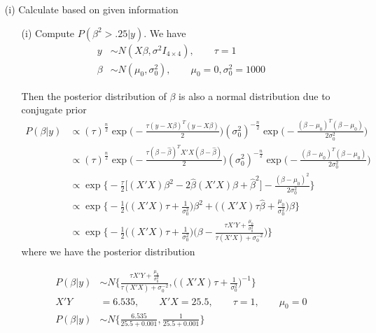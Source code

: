 \begin{itemize}

\item[(i)] Calculate based on given information 

\begin{itemize}
\item[(i)] Compute $P(\beta^2 > .25| y)$.
We have
\begin{align*}
y & \sim N(X \beta, \sigma^2 I_{4 \times 4}), \qquad \tau = 1 \\
\beta & \sim N(\mu_0, \sigma_0^2), \qquad \mu_0 = 0,  \sigma_0^2= 1000
\end{align*}	

Then the posterior distribution of $\beta$ is also a normal distribution due to conjugate prior
\begin{align*}
P(\beta | y) & \propto (\tau)^{\frac{n}{2}} \exp \Big(- \frac{\tau (y- X\beta)^T (y- X\beta)}{2} \Big) (\sigma_0^2)^{-\frac{n}{2}} \exp \Big( -\frac{(\beta - \mu_0)^T (\beta - \mu_0)}{2 \sigma_0^2} \Big) \\
& \propto (\tau)^{\frac{n}{2}} \exp \Big(- \frac{\tau (\beta- \hat\beta)^T X'X (\beta- \hat\beta)}{2} \Big) (\sigma_0^2)^{-\frac{n}{2}} \exp \Big( -\frac{(\beta - \mu_0)^T (\beta - \mu_0)}{2 \sigma_0^2} \Big) \\
& \propto \exp \Bigg \{ -\frac{\tau}{2} \Big[ (X'X) \beta^2 - 2 \hat{\beta} (X'X) \beta + \hat{\beta}^2 \Big] - \frac{(\beta - \mu_0)^2}{2 \sigma_0^2} \Bigg\} \\
& \propto  \exp \Bigg \{ -\frac{1}{2} \Big( (X'X)\tau + \frac{1}{\sigma_0^2}  \Big) \beta^2  + \Big( (X'X)\tau \hat{\beta} + \frac{\mu_0}{\sigma_0^2} \Big) \beta \Bigg\} \\
& \propto \exp \Bigg \{ -\frac{1}{2} \Big( (X'X)\tau + \frac{1}{\sigma_0^2}  \Big) \Bigg( \beta - \frac{\tau X'Y + \frac{\mu_0}{\sigma_0^2}}{\tau (X'X) + \sigma_0^{-2}}\Bigg) \Bigg\}
\end{align*}	
where we have the posterior distribution

\begin{align*}
P(\beta | y) & \sim N \Bigg \{ \frac{\tau X'Y + \frac{\mu_0}{\sigma_0^2}}{\tau (X'X) + \sigma_0^{-2}}, \Big( (X'X)\tau + \frac{1}{\sigma_0^2}  \Big)^{-1}  \Bigg\} \\
X'Y &= 6.535, \qquad X'X = 25.5,\qquad \tau = 1,\qquad \mu_0 = 0 \\
P(\beta | y) & \sim N \{ \frac{6.535}{25.5 + 0.001}, \frac{1}{25.5+0.001} \} 
\end{align*}


\end{itemize}
\end{itemize}
